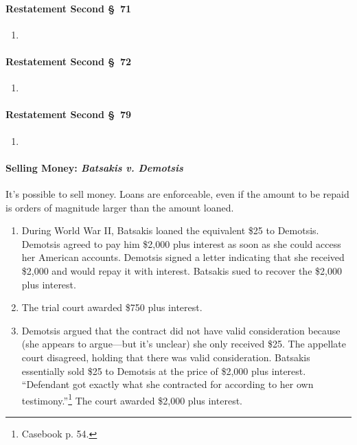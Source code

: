 \paragraph{Restatement Second \S\ 71}

\begin{enumerate}
    \item %
\end{enumerate}

\paragraph{Restatement Second \S\ 72}

\begin{enumerate}
    \item %
\end{enumerate}

\paragraph{Restatement Second \S\ 79}

\begin{enumerate}
    \item %
\end{enumerate}

\paragraph{Selling Money: \emph{Batsakis v. Demotsis}}

It's possible to sell money. Loans are enforceable, even if the amount to be 
repaid is orders of magnitude larger than the amount loaned.

\begin{enumerate}
    \item During World War II, Batsakis loaned the equivalent \$25 to 
    Demotsis. Demotsis agreed to pay him \$2,000 plus interest as soon as she 
    could access her American accounts. Demotsis signed a letter indicating 
    that she received \$2,000 and would repay it with interest. Batsakis sued 
    to recover the \$2,000 plus interest.
    \item The trial court awarded \$750 plus interest.
    \item Demotsis argued that the contract did not have valid consideration 
    because (she appears to argue---but it's unclear) she only received \$25. 
    The appellate court disagreed, holding that there was valid consideration. 
    Batsakis essentially sold \$25 to Demotsis at the price of \$2,000 plus 
    interest. ``Defendant got exactly what she contracted for according to her 
    own testimony.''\footnote{Casebook p. 54.} The court awarded \$2,000 plus 
    interest.
\end{enumerate}

